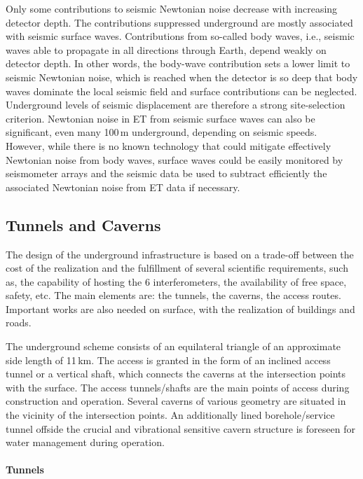 Only some contributions to seismic Newtonian noise decrease with increasing detector depth. The contributions suppressed underground are mostly associated with seismic surface waves. Contributions from so-called body waves, i.e., seismic waves able to propagate in all directions through Earth, depend weakly on detector depth. In other words, the body-wave contribution sets a lower limit to seismic Newtonian noise, which is reached when the detector is so deep that body waves dominate the local seismic field and surface contributions can be neglected. Underground levels of seismic displacement are therefore a strong site-selection criterion. Newtonian noise in ET from seismic surface waves can also be significant, even many 100\,m underground, depending on seismic speeds. However, while there is no known technology that could mitigate effectively Newtonian noise from body waves, surface waves could be easily monitored by seismometer arrays and the seismic data be used to subtract efficiently the associated Newtonian noise from ET data if necessary. 

\subsection{Tunnels and Caverns}
\label{Sec:TunnelsCaverns} 

The design of the underground infrastructure is based on a trade-off between the
cost of the realization and the fulfillment of several scientific requirements,
such as, the capability of hosting the 6 interferometers, the availability of free space, safety, 
etc. The main elements are: the tunnels, the caverns, the access routes. Important
works are also needed on surface, with the realization of buildings and roads.

The underground scheme consists of an equilateral triangle of an approximate side length of 11\,km. The access is granted in the form of an inclined access tunnel or a vertical shaft, which connects the caverns at the intersection points with the surface.
The access tunnels/shafts are the main points of access during construction and operation. Several caverns of various geometry are situated in the vicinity of the intersection points. An additionally lined borehole/service tunnel offside the crucial and vibrational sensitive cavern structure is foreseen for water management during operation.

\paragraph{Tunnels}

